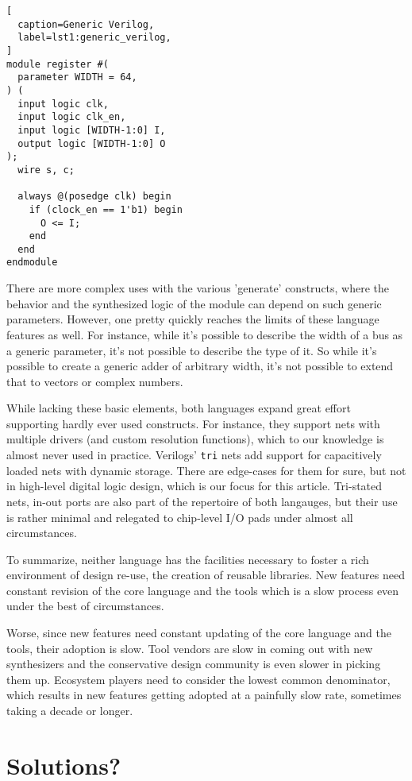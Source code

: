 \documentclass[conference,compsoc]{IEEEtran}
\begin{document}
\begin{lstlisting}[
  caption=Generic Verilog,
  label=lst1:generic_verilog,
]
module register #(
  parameter WIDTH = 64,
) (
  input logic clk,
  input logic clk_en,
  input logic [WIDTH-1:0] I,
  output logic [WIDTH-1:0] O
);
  wire s, c;

  always @(posedge clk) begin
    if (clock_en == 1'b1) begin
      O <= I;
    end
  end
endmodule
\end{lstlisting}

There are more complex uses with the various 'generate' constructs, where the behavior and the
synthesized logic of the module can depend on such generic parameters. However, one pretty
quickly reaches the limits of these language features as well. For instance, while it's possible
to describe the width of a bus as a generic parameter, it's not possible to describe the type of
it. So while it's possible to create a generic adder of arbitrary width, it's not possible to
extend that to vectors or complex numbers.

While lacking these basic elements, both languages expand great effort supporting hardly ever
used constructs. For instance, they support nets with multiple drivers (and custom resolution
functions), which to our knowledge is almost never used in practice. Verilogs' {\tt tri} nets
add support for capacitively loaded nets with dynamic storage. There are edge-cases for them
for sure, but not in high-level digital logic design, which is our focus for this article.
Tri-stated nets, in-out ports are also part of the repertoire of both langauges, but their
use is rather minimal and relegated to chip-level I/O pads under almost all circumstances.

To summarize, neither language has the facilities necessary to foster a rich environment of
design re-use, the creation of reusable libraries. New features need constant revision of
the core language and the tools which is a slow process even under the best of circumstances.

Worse, since new features need constant updating of the core language and the tools, their
adoption is slow. Tool vendors are slow in coming out with new synthesizers and the conservative
design community is even slower in picking them up. Ecosystem players need to consider the lowest
common denominator, which results in new features getting adopted at a painfully slow rate,
sometimes taking a decade or longer.

\section{Solutions?}
\end{document}
